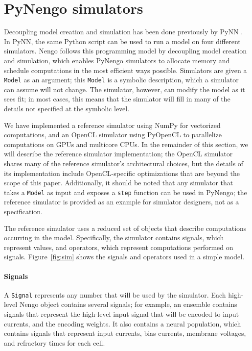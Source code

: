 \documentclass{frontiersSCNS}
\begin{document}
\section{PyNengo simulators} \label{sec:simulators}

Decoupling model creation and simulation
has been done previously
by PyNN \cite{TODO}.
In PyNN, the same Python script
can be used to run a model
on four different simulators.
Nengo follows this programming model by
decoupling model creation and simulation,
which enables PyNengo simulators
to allocate memory and schedule computations
in the most efficient ways possible.
Simulators are given a \texttt{Model}
as an argument;
this \texttt{Model} is a symbolic description,
which a simulator can assume will not change.
The simulator, however,
can modify the model as it sees fit;
in most cases, this means that the simulator
will fill in many of the details
not specified at the symbolic level.

We have implemented
a reference simulator using NumPy
for vectorized computations,
and an OpenCL simulator
using PyOpenCL to parallelize
computations on GPUs and multicore CPUs.
In the remainder of this section,
we will describe
the reference simulator implementation;
the OpenCL simulator shares many
of the reference simulator's architectural choices,
but the details of its implementation
include OpenCL-specific optimizations
that are beyond the scope of this paper.
Additionally, it should be noted that
any simulator that takes a \texttt{Model}
as input and exposes a \texttt{step}
function can be used in PyNengo;
the reference simulator
is provided as an example
for simulator designers,
not as a specification.

The reference simulator
uses a reduced set of objects
that describe computations
occurring in the model.
Specifically, the simulator
contains signals, which represent values,
and operators, which represent computations
performed on signals.
Figure~\ref{fig:sim} shows the signals
and operators used in a simple model.

\paragraph{Signals}

A \texttt{Signal} represents any number that
will be used by the simulator.
Each high-level Nengo object contains
several signals;
for example, an ensemble contains signals
that represent the high-level input
signal that will be encoded
to input currents,
and the encoding weights.
It also contains a neural population,
which contains signals that represent
input currents, bias currents,
membrane voltages, and refractory times for each cell.
\end{document}
